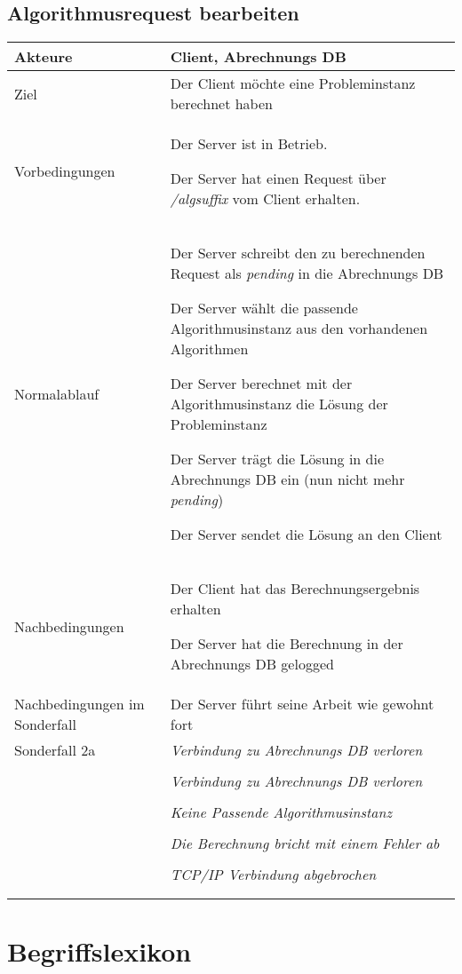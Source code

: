 \documentclass[a4paper,10pt,titlepage]{article}
\makeatletter
\newcommand\novspace{\@minipagetrue}
\newenvironment{owncompactitem}{%
\compactitem
}{%
\@finalstrut\@arstrutbox
\@nameuse{endcompactitem}%
\aftergroup\let\aftergroup\@finalstrut\aftergroup\@gobble
}
\newenvironment{owncompactenum}{%
\compactenum
}{%
\@finalstrut\@arstrutbox
\@nameuse{endcompactenum}%
\aftergroup\let\aftergroup\@finalstrut\aftergroup\@gobble
}
\newcommand{\usecase}[7]
{\subsection{#1}
\setlength{\extrarowheight}{2pt}
\begin{tabular}{|p{0.2\textwidth}|p{0.9\textwidth}|}
\hline
  Akteure & #2\\\hline
  Ziel & #3\\\hline
  Vorbedingungen & \novspace
  	\begin{owncompactitem}[-] #4 \end{owncompactitem} \\\hline
  Normalablauf & \vspace{-7pt}
  	\begin{owncompactenum}[1.] #6 \end{owncompactenum} \\\hline
  Nachbedingungen & \novspace
  	\begin{owncompactitem}[-] #5 \end{owncompactitem} \\\hline
  #7
\end{tabular}
}
\newcommand{\sonderfall}[4][\empty]
{
Sonderfall #2 & \vspace{-10pt}
	\textit{#3}
	\begin{owncompactenum}[{#2}.1] {#4} \end{owncompactenum}
  	\ifthenelse{\equal{#1}{\empty}}
    	{\\\hline} %
    	{\ensuremath{\rightarrow} #1 \\ [+1pt] \hline} %

}
\newcommand{\sondernachbedingung}[1]
{
Nachbedingungen im Sonderfall& \novspace
	\begin{owncompactitem}[-]
		#1
	\end{owncompactitem} \\\hline
}
\newcommand{\begriff}[7]
{\subsection{#1}
\begin{tabular}{|p{0.2\textwidth}|p{0.7\textwidth}|}
\hline
  Bedeutung & #2\\\hline
  Abgrenzung & #3\\\hline
  Gültigkeit & #4\\\hline
  Bezeichnung & #5\\\hline
  Unklarheiten & #6\\\hline
  Querverweise & #7\\\hline
 \end{tabular}}
\makeatother
\begin{document}
\usecase{Algorithmusrequest bearbeiten}{Client, Abrechnungs DB}%
{Der Client möchte eine Probleminstanz berechnet haben}%
{%
\item Der Server ist in Betrieb.
\item Der Server hat einen Request über \textit{/algsuffix} vom Client erhalten.
}
{%
\item Der Client hat das Berechnungsergebnis erhalten
\item Der Server hat die Berechnung in der Abrechnungs DB gelogged
}
{%
\item Der Server schreibt den zu berechnenden Request als \textit{pending} in die Abrechnungs DB
\item Der Server wählt die passende Algorithmusinstanz aus den vorhandenen Algorithmen
\item Der Server berechnet mit der Algorithmusinstanz die Lösung der Probleminstanz
\item Der Server trägt die Lösung in die Abrechnungs DB ein (nun nicht mehr \textit{pending})
\item Der Server sendet die Lösung an den Client
}
{%
\sondernachbedingung{
\item Der Server führt seine Arbeit wie gewohnt fort
}
\sonderfall[Panic]{2a}%
	{Verbindung zu Abrechnungs DB verloren}%
  	{
	\item Der Fehler wird ins Log geschrieben (als schwerwiegender Fehler)
	\item Der Server wird beendet
  	}
\sonderfall[Panic]{4a}%
	{Verbindung zu Abrechnungs DB verloren}%
	{\item \textit{siehe 2a}}
\sonderfall[Weiter mit normalem Betrieb]{2a}%
	{Keine Passende Algorithmusinstanz}%
  	{
	\item Der Fehler wird ins Log geschrieben
	\item Der Client erhält eine entsprechende Fehlermeldung
  	}
\sonderfall[Weiter mit normalem Betrieb]{3a}%
	{Die Berechnung bricht mit einem Fehler ab}%
  	{
	\item Der Fehler wird ins Log geschrieben
	\item Der Request wird in der Abrechnungs DB auf failed gesetzt und der genaue Fehler eingetragen
	\item Der Client erhält eine entsprechende Fehlermeldung
  	}
\sonderfall[Weiter mit normalem Betrieb]{5a}%
	{TCP/IP Verbindung abgebrochen}%
  	{\item Der Fehler wird ins Log geschrieben
  	}
}


\clearpage
\appendix
\section{Begriffslexikon}

\end{document}
